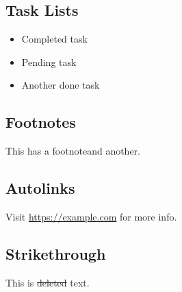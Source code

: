 \subsection{Task Lists}\label{task-lists}
\begin{itemize}
\tightlist
\item[$\boxtimes$] Completed task

\item[$\square$] Pending task

\item[$\boxtimes$] Another done task

\end{itemize}
\subsection{Footnotes}\label{footnotes}
This has a footnote\footnotemark[1] and another\footnotemark[note].

\subsection{Autolinks}\label{autolinks}
Visit \url{https://example.com} for more info.

\subsection{Strikethrough}\label{strikethrough}
This is \sout{deleted} text.


